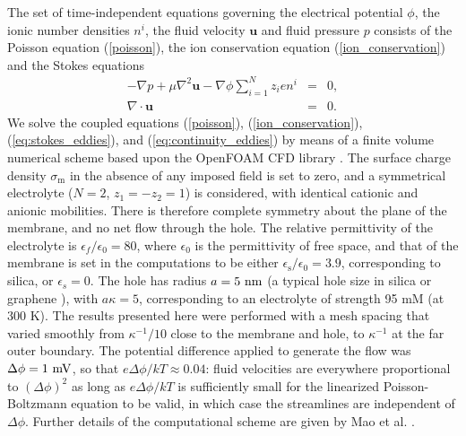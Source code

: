 The set of
time-independent equations governing the electrical potential
$\phi$, the ionic number densities $n^i$,
the fluid velocity $\mathbf{u}$ and fluid pressure $p$
consists of the Poisson equation (\ref{poisson}), the ion
conservation equation (\ref{ion_conservation}) and the Stokes equations
\begin{eqnarray}
-\nabla p + \mu \nabla^2 \mathbf{u} -  \nabla \phi \sum_{i=1}^{N} z_ien^i & = & 0, \label{eq:stokes_eddies}\\
\nabla \cdot \mathbf{u} & = & 0. \label{eq:continuity_eddies}
\end{eqnarray}
We solve the coupled equations (\ref{poisson}), (\ref{ion_conservation}),
(\ref{eq:stokes_eddies}),  and (\ref{eq:continuity_eddies})
by means of a finite volume numerical scheme based upon the
OpenFOAM CFD library \cite{OPENFOAM}.
The surface charge density $\sigma_\text{m}$ in the absence
of any imposed field
is set to zero, and a symmetrical electrolyte
($N=2$, $z_1=-z_2=1$)  is considered, with
identical cationic and anionic mobilities.
There is therefore complete symmetry about the plane of the
membrane, and no net flow through the hole. The relative permittivity
of the electrolyte
is $\epsilon_f/\epsilon_0=80$, where $\epsilon_0$ is the permittivity of
free space, and that of the membrane is set in the computations to be either
$\epsilon_\text{s}/\epsilon_0=3.9$,
corresponding to silica, or $\epsilon_s=0$.
The hole has radius $a=5\rm\ nm$ (a typical
hole size in silica\cite{Keyser2006} or graphene \cite{Garaj2010,Merchant2010}), with
$a\kappa=5$, corresponding to an electrolyte
of strength 95 mM (at 300 K).
The results presented here were performed with a mesh spacing
that varied smoothly from $\kappa^{-1}/10$
close to the membrane and hole, to $\kappa^{-1}$ at the far outer boundary.
The potential difference applied to generate the flow was $\Delta\phi=1\rm\ mV$,
so that $e\Delta\phi/kT\approx 0.04$: fluid velocities are
everywhere proportional
to $(\Delta\phi)^2$ as long as $e\Delta\phi/kT$ is sufficiently small
for the linearized Poisson-Boltzmann equation to be valid, in which case
the streamlines are independent of $\Delta\phi$.
Further details of the computational scheme are given by
Mao et al. \cite{mao2014}.

